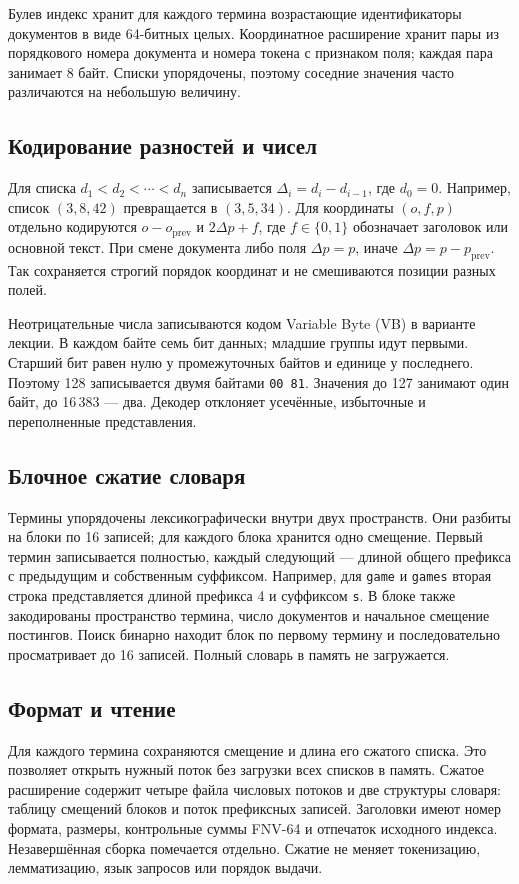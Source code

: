 \documentclass[12pt,a4paper]{article}
\begin{document}
Булев индекс хранит для каждого термина возрастающие идентификаторы документов
в виде 64-битных целых. Координатное расширение хранит пары из порядкового номера
документа и номера токена с признаком поля; каждая пара занимает 8 байт.
Списки упорядочены, поэтому соседние значения часто различаются на небольшую величину.

\subsection{Кодирование разностей и чисел}
Для списка $d_1<d_2<\cdots<d_n$ записывается $\Delta_i=d_i-d_{i-1}$,
где $d_0=0$. Например, список $(3,8,42)$ превращается в $(3,5,34)$.
Для координаты $(o,f,p)$ отдельно кодируются $o-o_{\mathrm{prev}}$ и
$2\Delta p+f$, где $f\in\{0,1\}$ обозначает заголовок или основной текст.
При смене документа либо поля $\Delta p=p$, иначе $\Delta p=p-p_{\mathrm{prev}}$.
Так сохраняется строгий порядок координат и не смешиваются позиции разных полей.

Неотрицательные числа записываются кодом Variable Byte (VB) в варианте лекции.
В каждом байте семь бит данных; младшие группы идут первыми. Старший бит равен
нулю у промежуточных байтов и единице у последнего. Поэтому 128 записывается
двумя байтами \texttt{00 81}. Значения до 127 занимают один байт, до
16\,383 --- два. Декодер
отклоняет усечённые, избыточные и переполненные представления.

\subsection{Блочное сжатие словаря}
Термины упорядочены лексикографически внутри двух пространств. Они разбиты на
блоки по 16 записей; для каждого блока хранится одно смещение. Первый термин
записывается полностью, каждый следующий --- длиной общего префикса с предыдущим
и собственным суффиксом. Например, для \texttt{game} и \texttt{games} вторая
строка представляется длиной префикса 4 и суффиксом \texttt{s}.
В блоке также закодированы пространство термина, число документов и начальное
смещение постингов. Поиск бинарно находит блок по первому термину и последовательно
просматривает до 16 записей. Полный словарь в память не загружается.

\subsection{Формат и чтение}
Для каждого термина сохраняются смещение и длина его сжатого списка.
Это позволяет открыть нужный поток без загрузки всех списков в память.
Сжатое расширение содержит четыре файла числовых потоков и две структуры
словаря: таблицу смещений блоков и поток префиксных записей.
Заголовки имеют номер формата, размеры,
контрольные суммы FNV-64 и отпечаток исходного индекса. Незавершённая сборка
помечается отдельно. Сжатие не меняет токенизацию, лемматизацию, язык запросов
или порядок выдачи.
\end{document}

